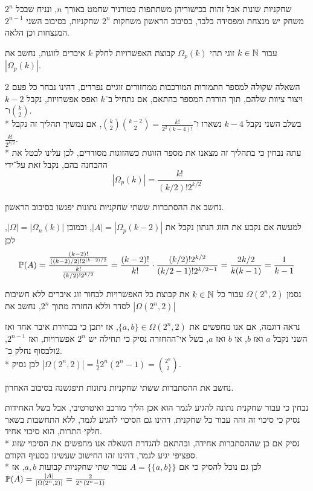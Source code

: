 \Question{}
$2^n$ שחקניות שונות אבל זהות בכישוריהן משתתפות בטורניר שחמט באורך $n$, ונניח שבכל משחק יש מנצחת ומפסידה בלבד, בסיבוב הראשון משחקות $2^n$ שחקניות, בסיבוב השני $2^{n - 1}$ המנצחות וכן הלאה.

\Subquestion{}
עבור $k \in \mathbb{N}$ זוגי תהי $\Omega_p(k)$ קבוצת האפשרויות לחלק $k$ איברים לזוגות, נחשב את $|\Omega_p(k)|$.
\begin{solution}
	השאלה שקולה למספר התמורות המורכבות ממחזורים זוגיים נפרדים, דהינו נבחר כל פעם 2 ויצור ציוות שלהם, תוך הורדת המספר בהתאם, אם נתחיל ב־$k$ ואפס אפשרויות, נקבל $k - 2$ ו־$\binom{k}{2}$. \\*
	בשלב השני נקבל $k - 4$ נשארו ו־$\binom{k}{2} \binom{k - 2}{2} = \frac{k!}{2^2 (k - 4)!}$, אם נמשיך תהליך זה נקבל $\frac{k!}{2^{k / 2}}$. \\*
	עתה נבחין כי בתהליך זה מצאנו את מספר הזוגות כשהזוגות מסודרים, לכן עלינו לבטל את ההבחנה בהם, נקבל זאת על־ידי
	\[
		|\Omega_p(k)| = \frac{k!}{(k / 2)! 2^{k / 2}}
	\]
\end{solution}

\Subquestion{}
נחשב את ההסתברות ששתי שחקניות נתונות יפגשו בסיבוב הראשון.
\begin{solution}
	למעשה אם נקבע את הזוג הנתון נקבל את $|A| = |\Omega_p(k - 2)|$, וכמובן $|\Omega| = |\Omega_n(k)|$, לכן
	\[
		\mathbb{P}(A)
		= \frac{\frac{(k - 2)!}{((k - 2) / 2)! 2^{(k - 2) / 2}}}{\frac{k!}{(k / 2)! 2^{k / 2}}}
		= \frac{(k - 2)!}{k!} \cdot \frac{(k / 2)! 2^{k / 2}}{(k / 2 - 1)! 2^{k / 2 - 1}}
		= \frac{2 k / 2}{k(k - 1)}
		= \frac{1}{k - 1}
	\]
\end{solution}

\Subquestion{}
נסמן $\Omega(2^n, 2)$ עבור כל $k \in \mathbb{N}$ את קבוצת כל האפשרויות לבחור זוג איברים ללא חשיבות לסדר וללא החזרה מתוך $2^n$, נחשב את $|\Omega(2^n, 2)|$
\begin{solution}
	נראה דוגמה, אם אנו מחפשים את $\{ a, b \} \in \Omega(2^n, 2)$, אז יתכן כי בבחירת איבר אחד ואז השני נקבל $a$ ואז $b$, או $b$ ואז $a$, בשל אי־ההחזרה נסיק כי תחילה יש $2^n$ אפשרויות, ואז $2^{n - 1}$, ולבסוף נחלק ב־$2$. \\*
	לכן נסיק $|\Omega(2^n, 2)| = \frac{1}{2} 2^n (2^n - 1) = \binom{2^n}{2}$.
\end{solution}

\Subquestion{}
נחשב את ההסתברות ששתי שחקניות נתונות תיפגשנה בסיבוב האחרון.
\begin{solution}
	נבחין כי עבור שחקנית נתונה להגיע לגמר הוא אכן הליך מורכב ואיטרטיבי, אבל בשל האחידות נסיק כי סיכוי זה זהה עבור כל שחקנית, דהינו גם הסיכוי להגיע לגמר, ללא התחשבות בשאר חלקי התרות, הוא סיכוי אחיד. \\*
	נסיק אם כן שההסתברות אחידה, ובהתאם להגדרת השאלה אנו מחפשים את הסיכוי שזוג ספציפי יגיע לגמר, דהינו זהו החישוב שעשינו בסעיף הקודם. \\*
	לכן גם נוכל להסיק כי אם $A = \{ \{a, b\} \}$ עבור שתי שחקניות קבועות $a, b$, אז $\mathbb{P}(A) = \frac{|A|}{|\Omega(2^n, 2)|} = \frac{2}{2^n (2^n - 1)}$
\end{solution}

